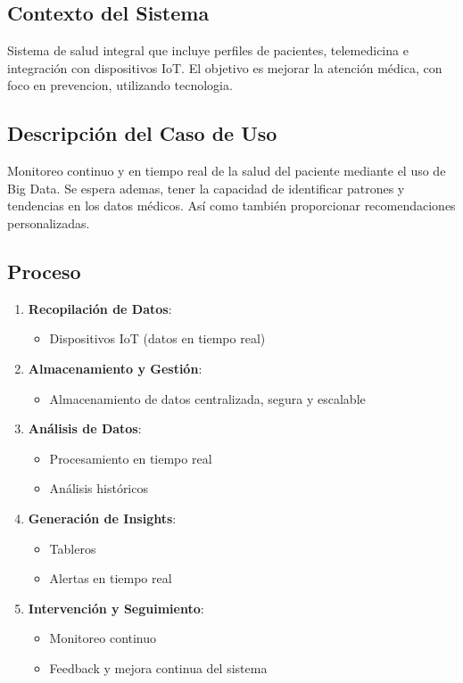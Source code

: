 \subsection{Contexto del Sistema}
Sistema de salud integral que incluye perfiles de pacientes, telemedicina e integración con dispositivos IoT. El objetivo es mejorar la atención médica, con foco en prevencion, utilizando tecnologia.

\subsection{Descripción del Caso de Uso}
Monitoreo continuo y en tiempo real de la salud del paciente mediante el uso de Big Data. Se espera ademas, tener la capacidad de identificar patrones y tendencias en los datos médicos. Así como también proporcionar recomendaciones personalizadas.

\subsection{Proceso}
\begin{enumerate}
    \item \textbf{Recopilación de Datos}:
    \begin{itemize}
        \item Dispositivos IoT (datos en tiempo real)
    \end{itemize}
    
    \item \textbf{Almacenamiento y Gestión}:
    \begin{itemize}
        \item Almacenamiento de datos centralizada, segura y escalable
    \end{itemize}
    
    \item \textbf{Análisis de Datos}:
    \begin{itemize}
        \item Procesamiento en tiempo real
        \item Análisis históricos
    \end{itemize}
    
    \item \textbf{Generación de Insights}:
    \begin{itemize}
        \item Tableros
        \item Alertas en tiempo real
    \end{itemize}
    
    \item \textbf{Intervención y Seguimiento}:
    \begin{itemize}
        \item Monitoreo continuo
        \item Feedback y mejora continua del sistema
    \end{itemize}
\end{enumerate}
